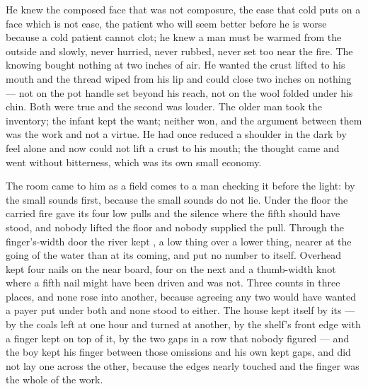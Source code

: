 He knew the composed face that was not composure, the ease that cold puts on a face which is not ease, the patient who will seem better before he is worse because a cold patient cannot clot; he knew a man must be warmed from the outside and slowly, never hurried, never rubbed, never set too near the fire. The knowing bought nothing at two inches of air. He wanted the crust lifted to his mouth and the thread wiped from his lip and could close two inches on nothing --- not on the pot handle set beyond his reach, not on the wool folded under his chin. Both were true and the second was louder. The older man took the inventory; the infant kept the want; neither won, and the argument between them was the work and not a virtue. He had once reduced a shoulder in the dark by feel alone and now could not lift a crust to his mouth; the thought came and went without bitterness, which was its own small economy.

The room came to him as a field comes to a man checking it before the light: by the small sounds first, because the small sounds do not lie. Under the floor the carried fire gave its four low pulls and the silence where the fifth should have stood, and nobody lifted the floor and nobody supplied the pull. Through the finger's-width door the river kept , a low thing over a lower thing, nearer at the going of the water than at its coming, and put no number to itself. Overhead  kept four nails on the near board, four on the next and a thumb-width knot where a fifth nail might have been driven and was not. Three counts in three places, and none rose into another, because agreeing any two would have wanted a payer put under both and none stood to either. The house kept itself by its  --- by the coals left at one hour and turned at another, by the shelf's front edge with a finger kept on top of it, by the two gaps in a row that nobody figured --- and the boy kept his finger between those omissions and his own kept gaps, and did not lay one across the other, because the edges nearly touched and the finger was the whole of the work.

\scenebreak

